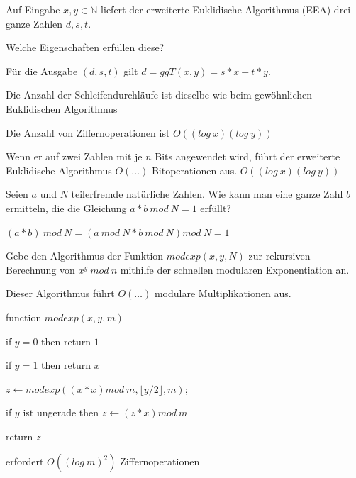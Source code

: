 \documentclass[avery5371, frame]{flashcards}
\begin{document}
\begin{flashcard}[Zahlentheorie]{Auf Eingabe $x,y\in\mathbb{N}$ liefert der erweiterte Euklidische Algorithmus (EEA) drei ganze Zahlen $d,s,t$.

        Welche Eigenschaften erfüllen diese?}

    \begin{enumerate*}
        \item Für die Ausgabe $(d,s,t)$ gilt $d= ggT(x,y) =s*x+t*y$.
        \item Die Anzahl der Schleifendurchläufe ist dieselbe wie beim gewöhnlichen Euklidischen Algorithmus
        \item Die Anzahl von Ziffernoperationen ist $O((log\ x)(log\ y))$
    \end{enumerate*}
\end{flashcard}

\begin{flashcard}[Zahlentheorie]{Wenn er auf zwei Zahlen mit je $n$ Bits angewendet wird, führt der erweiterte Euklidische Algorithmus $O(\dots)$ Bitoperationen aus.}
    $O((log\ x)(log\ y))$
\end{flashcard}

\begin{flashcard}[Zahlentheorie]{Seien $a$ und $N$ teilerfremde natürliche Zahlen. Wie kann man eine ganze Zahl $b$ ermitteln, die die Gleichung $a*b\ mod\ N= 1$ erfüllt?}

    $(a*b)\ mod\ N = (a\ mod\ N * b\ mod\ N)mod\ N = 1$
\end{flashcard}

\begin{flashcard}[Zahlentheorie]{Gebe den Algorithmus der Funktion $modexp(x,y,N)$ zur rekursiven Berechnung von $x^y\ mod\ n$ mithilfe der schnellen modularen Exponentiation an.

        Dieser Algorithmus führt $O(\dots)$ modulare Multiplikationen aus.}

    function $modexp(x,y,m)$
    \begin{itemize*}
        \item[] if $y= 0$ then return $1$
        \item[] if $y= 1$ then return $x$
        \item[] $z\leftarrow modexp((x*x) mod\ m,\lfloor y/2\rfloor,m);$ %
        \item[] if $y$ ist ungerade then $z\leftarrow (z*x) mod\ m$
        \item[] return $z$
    \end{itemize*}

    erfordert $O((log\ m)^2)$ Ziffernoperationen
\end{flashcard}
\end{document}
